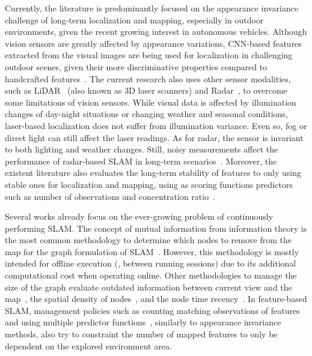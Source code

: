 Currently, the literature is predominantly focused on the appearance invariance challenge of long-term localization and mapping, especially in outdoor environments, given the recent growing interest in autonomous vehicles.
Although vision sensors are greatly affected by appearance variations, \gls{CNN}-based features extracted from the visual images are being used for localization in challenging outdoor scenes, given their more discriminative properties compared to handcrafted features~\cite{taisho-kanji:2016:7866383,xin-et-al:2017:8310121,chen-et-al:2018:2859916,yu-et-al:2019:8961714,camara-et-al:2020:9196967,liu-et-al:2021:9561126}.
The current research also uses other sensor modalities, such as \gls{LiDAR}~\cite{yin-et-al:2018:8593562,kim-et-al:2019:2897340,xu-et-al:2021:3060741,yin-et-al:2021:661199} (also known as 3D laser scanners) and Radar~\cite{martini-et-al:2020:s20216002,yin-et-al:2021:661199}, to overcome some limitations of vision sensors.
While visual data is affected by illumination changes of day-night situations or changing weather and seasonal conditions, laser-based localization does not suffer from illumination variance. Even so, fog or direct light can still affect the laser readings. As for radar, the sensor is invariant to both lighting and weather changes. Still, noisy measurements affect the performance of radar-based \gls{SLAM} in long-term scenarios~\cite{yin-et-al:2021:661199}.
Moreover, the existent literature also evaluates the long-term stability of features to only using stable ones for localization and mapping, using as scoring functions predictors such as number of observations and concentration ratio~\cite{berrio-et-al:2019:8814289,berrio-et-al:2021:3094485}.

Several works already focus on the ever-growing problem of continuously performing \gls{SLAM}.
The concept of mutual information from information theory is the most common methodology to determine which nodes to remove from the map for the graph formulation of \gls{SLAM}~\cite{kretzschmar-et-al:2010:2,kretzschmar-stachniss:2012:0278364912455072,huang-et-al:2013:6698835,carlevaris-bianco-et-al:2014:2347571,mazuran-et-al:2016:0278364915581629}. However, this methodology is mostly intended for offline execution (\eg, between running sessions) due to its additional computational cost when operating online.
Other methodologies to manage the size of the graph evaluate outdated information between current view and the map~\cite{walcott-bryant-et-al:2012:6385561,boniardi-et-al:2019:003}, the spatial density of nodes~\cite{johannsson-et-al:2013:6630556,zeng-si:2021:6}, and the node time recency~\cite{kurz-et-al:2021:9636530,ali-et-al:2021:3100882}.
In feature-based \gls{SLAM}, management policies such as counting matching observations of features~\cite{dayoub-et-al:2011:013,bacca-et-al:2013:003} and using multiple predictor functions~\cite{berrio-et-al:2019:8814289,berrio-et-al:2021:3094485,dymczyk-et-al:2016:7759673,mühlfellner-et-al:2016:21595}, similarly to appearance invariance methods, also try to constraint the number of mapped features to only be dependent on the explored environment area.


